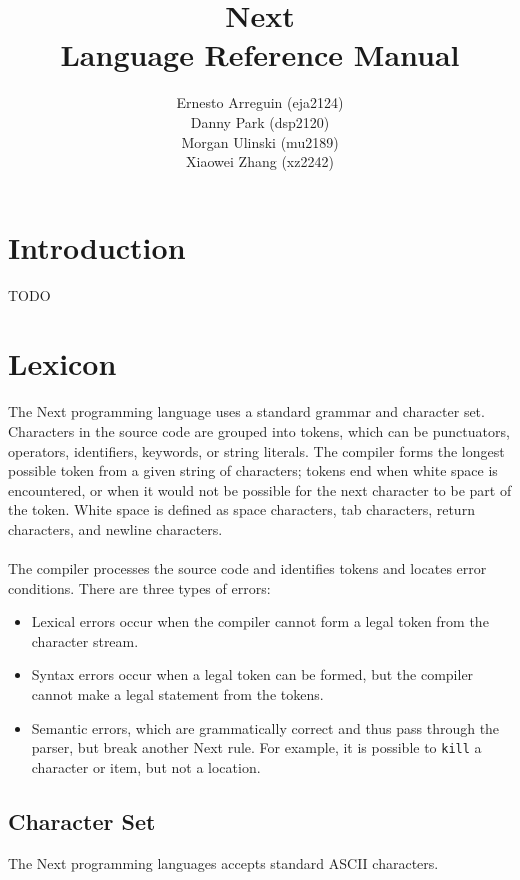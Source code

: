 \documentclass[12pt]{article}
\begin{document}
\title{\textbf{Next} \\ Language Reference Manual}
\author{Ernesto Arreguin (eja2124) \\Danny Park (dsp2120) \\Morgan Ulinski (mu2189) \\Xiaowei Zhang (xz2242)}
\date{}
\maketitle

\pagebreak

\tableofcontents

\section{Introduction}
TODO

\section{Lexicon}
The Next programming language uses a standard grammar and character set.  Characters in the source code are grouped into tokens, which can be punctuators, operators, identifiers, keywords, or string literals.  The compiler forms the longest possible token from a given string of characters; tokens end when white space is encountered, or when it would not be possible for the next character to be part of the token.  White space is defined as space characters, tab characters, return characters, and newline characters.
\\
\\
\noindent The compiler processes the source code and identifies tokens and locates error conditions.  There are three types of errors:
\begin{itemize}
\item Lexical errors occur when the compiler cannot form a legal token from the character stream.
\item Syntax errors occur when a legal token can be formed, but the compiler cannot make a legal statement from the tokens.
\item Semantic errors, which are grammatically correct and thus pass through the parser, but break another Next rule.  For example, it is possible to \texttt{kill} a character or item, but not a location.
\end{itemize}

\subsection{Character Set}
The Next programming languages accepts standard ASCII characters.
\end{document}
